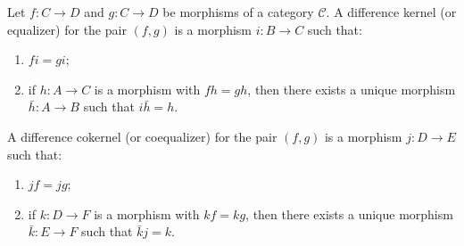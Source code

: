 Let $f : C \to D$ and $g : C \to D$ be morphisms of a category $\mathcal{C}$. A difference kernel (or equalizer) for the pair $(f, g)$ is a morphism $i : B \to C$ such that:
\begin{enumerate}
\item[(i)] $f i = g i$;
\item[(ii)] if $h : A \to C$ is a morphism with $f h = g h$, then there exists a unique morphism $\bar{h} : A \to B$ such that $i \bar{h} = h$.
\end{enumerate}

A difference cokernel (or coequalizer) for the pair $(f, g)$ is a morphism $j : D \to E$ such that:
\begin{enumerate}
\item[(i)] $j f = j g$;
\item[(ii)] if $k : D \to F$ is a morphism with $k f = k g$, then there exists a unique morphism $\bar{k} : E \to F$ such that $\bar{k} j = k$.
\end{enumerate}
